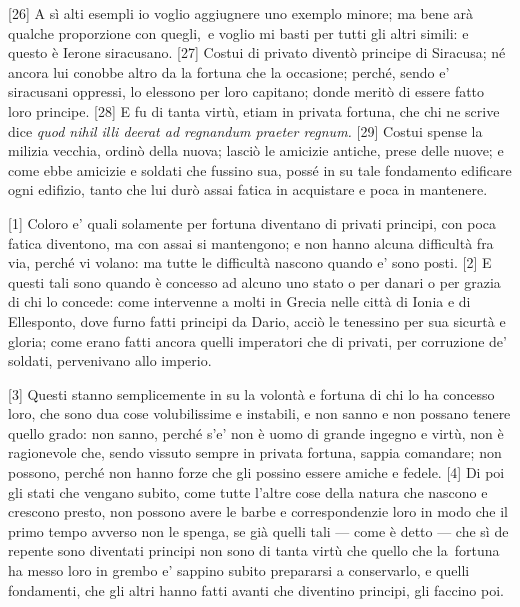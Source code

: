 {[}26{]} A sì alti esempli io voglio aggiugnere uno exemplo minore; ma
bene arà qualche proporzione con quegli,\est\ e voglio mi basti per tutti gli
altri simili: e questo è Ierone siracusano. {[}27{]} Costui di privato
diventò principe di Siracusa; né ancora lui conobbe altro da la fortuna
che la occasione; perché, sendo e' siracusani oppressi, lo elessono per
loro capitano; donde meritò di essere fatto loro principe. {[}28{]} E fu
di tanta virtù, etiam in privata fortuna, che chi ne scrive dice
\emph{quod nihil illi deerat ad regnandum praeter regnum.} {[}29{]}
Costui spense la milizia vecchia, ordinò della nuova; lasciò le amicizie
antiche, prese delle nuove; e come ebbe amicizie e soldati che fussino
sua, possé in su tale fondamento edificare ogni edifizio, tanto che lui
durò assai fatica in acquistare e poca in mantenere.


{[}1{]} Coloro e' quali solamente per fortuna diventano di privati
principi, con poca fatica diventono, ma con assai si mantengono; e non
hanno alcuna difficultà fra via, perché vi volano: ma tutte le
difficultà nascono quando e' sono posti. {[}2{]} E questi tali sono
quando è concesso ad alcuno uno stato o per danari o per grazia di chi
lo concede: come intervenne a molti in Grecia nelle città di Ionia e di
Ellesponto, dove furno fatti principi da Dario, acciò le tenessino per
sua sicurtà e gloria; come erano fatti ancora quelli imperatori che di
privati, per corruzione de' soldati, pervenivano allo imperio.

{[}3{]} Questi stanno semplicemente in su la volontà e fortuna di chi lo
ha concesso loro, che sono dua cose volubilissime e instabili, e non
sanno e non possano tenere quello grado: non sanno, perché s'e' non è
uomo di grande ingegno e virtù, non è ragionevole che, sendo vissuto
sempre in privata fortuna, sappia comandare; non possono, perché non
hanno forze che gli possino essere amiche e fedele. {[}4{]} Di poi gli
stati che vengano subito, come tutte l'altre cose della natura che
nascono e crescono presto, non possono avere le barbe e correspondenzie
loro in modo che il primo tempo avverso non le spenga, se già quelli
tali --- come è detto --- che sì de repente sono diventati principi non
sono di tanta virtù che quello che la\est\ fortuna ha messo loro in grembo e'
sappino subito prepararsi a conservarlo, e quelli fondamenti, che gli
altri hanno fatti avanti che diventino principi, gli faccino poi.

